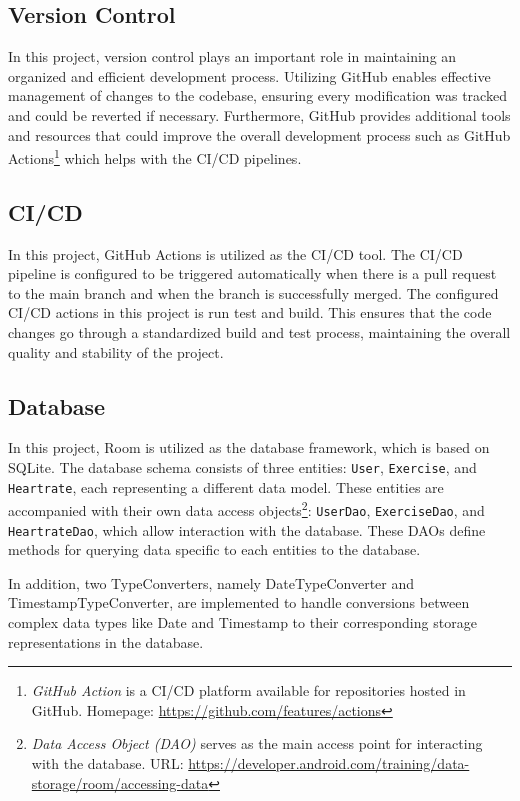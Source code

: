 \subsection{Version Control}
In this project, version control plays an important role in maintaining an organized and efficient development process. 
Utilizing GitHub enables effective management of changes to the codebase, ensuring every modification was tracked and could be reverted if necessary.  
Furthermore, GitHub provides additional tools and resources that could improve the overall development process such as GitHub Actions\footnote{\emph{GitHub Action} is a CI/CD platform available for repositories hosted in GitHub. Homepage: \url{https://github.com/features/actions}} which helps with the CI/CD pipelines. 

\subsection{CI/CD}
In this project, GitHub Actions is utilized as the CI/CD tool. 
The CI/CD pipeline is configured to be triggered automatically when there is a pull request to the main branch and when the branch is successfully merged. The configured CI/CD actions in this project is run test and build. 
This ensures that the code changes go through a standardized build and test process, maintaining the overall quality and stability of the project.

\subsection{Database}
In this project, Room is utilized as the database framework, which is based on SQLite.
The database schema consists of three entities: \texttt{User}, \texttt{Exercise}, and \texttt{Heartrate}, each representing a different data model.
These entities are accompanied with their own data access objects\footnote{\emph{Data Access Object (DAO)} serves as the main access point for interacting with the database. URL: \url{https://developer.android.com/training/data-storage/room/accessing-data}}: \texttt{UserDao}, \texttt{ExerciseDao}, and \texttt{HeartrateDao}, which allow interaction with the database. These DAOs define methods for querying data specific to each entities to the database.

In addition, two TypeConverters, namely DateTypeConverter and TimestampTypeConverter, are implemented to handle conversions between complex data types like Date and Timestamp to their corresponding storage representations in the database.

